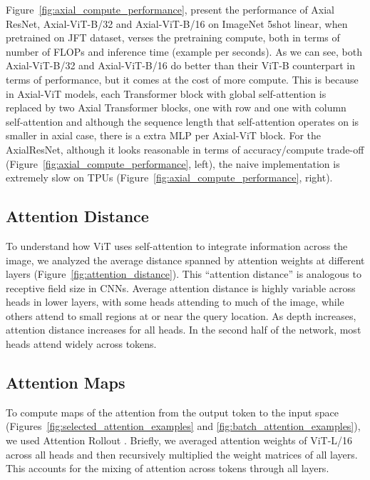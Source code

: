 \documentclass{article} \usepackage{iclr2021_conference,times}
\newcommand{\oursabbrv}{ViT\xspace}
\newcommand{\imagenet}{ImageNet\xspace}
\begin{document}
Figure~\ref{fig:axial_compute_performance}, present the performance of Axial ResNet, Axial-\oursabbrv-B/32 and Axial-\oursabbrv-B/16 on \imagenet 5shot linear, when pretrained on JFT dataset, verses the pretraining compute, both in terms of number of FLOPs and inference time (example per seconds). As we can see, both 
Axial-\oursabbrv-B/32 and Axial-\oursabbrv-B/16 do better than their \oursabbrv-B counterpart in terms of performance, but it comes at the cost of more compute. This is because in Axial-\oursabbrv models, each Transformer block with global self-attention is replaced by two Axial Transformer blocks, one with row and one with column self-attention and although the sequence length that self-attention operates on is smaller in axial case, there is a extra MLP per Axial-\oursabbrv block.  
For the AxialResNet, although it looks reasonable in terms of accuracy/compute trade-off (Figure~\ref{fig:axial_compute_performance}, left), the naive implementation is extremely slow on TPUs (Figure~\ref{fig:axial_compute_performance}, right).


 
\subsection{Attention Distance}
\label{sec:appendix_attention_distance}

To understand how \oursabbrv uses self-attention to integrate information across the image, we analyzed the average distance spanned by attention weights at different layers (Figure~\ref{fig:attention_distance}). This ``attention distance'' is analogous to receptive field size in CNNs. Average attention distance is highly variable across heads in lower layers, with some heads attending to much of the image, while others attend to small regions at or near the query location. As depth increases, attention distance increases for all heads. In the second half of the network, most heads attend widely across tokens.

\subsection{Attention Maps}
To compute maps of the attention from the output token to the input space (Figures~\ref{fig:selected_attention_examples} and \ref{fig:batch_attention_examples}), we used Attention Rollout \citep{abnar2020quantifying}. Briefly, we averaged attention weights of \oursabbrv-L/16 across all heads and then recursively multiplied the weight matrices of all layers. This accounts for the mixing of attention across tokens through all layers.
\end{document}
